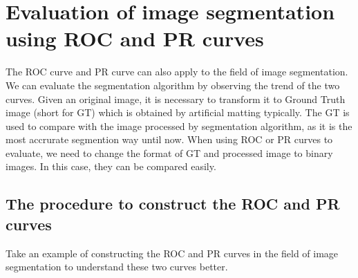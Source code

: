 \documentclass[a4paper,12pt]{article}
\begin{document}
\section{Evaluation of image segmentation using ROC and PR curves}
The ROC curve and PR curve can also apply to the field of image segmentation. We can evaluate the segmentation algorithm by observing the trend of the two curves. Given an original image, it is necessary to transform it to Ground Truth image (short for GT) which is obtained by artificial matting typically. The GT is used to compare with the image processed by segmentation algorithm, as it is the most accrurate segmention way until now. When using ROC or PR curves to evaluate, we need to change the format of GT and processed image to binary images. In this case, they can be compared easily.

\subsection{The procedure to construct the ROC and PR curves}
Take an example of constructing the ROC and PR curves in the field of image segmentation to understand these two curves better.  
\end{document}
